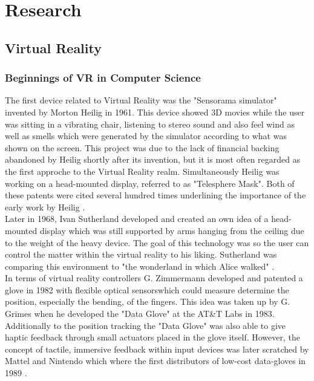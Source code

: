 \documentclass{report}
\begin{document}
\chapter{Research}

	\section{Virtual Reality}
	\startsection
		\subsection{Beginnings of VR in Computer Science}
		\startsubsection			
			The first device related to Virtual Reality was the "Sensorama simulator" invented by Morton Heilig \cite{Hei61} in 1961. This device showed 3D movies while the user was sitting in a vibrating chair, listening to stereo sound and also feel wind as well as smells which were generated by the simulator according to what was shown on the screen. This project was due to the lack of financial backing abandoned by Heilig shortly after its invention, but it is most often regarded as the first approche to the Virtual Reality realm. Simultaneously Heilig was working on a head-mounted display, referred to as "Telesphere Mask". Both of these patents were cited several hundred times underlining the importance of the early work by Heilig \cite{SKB15}. \\
			Later in 1968, Ivan Sutherland developed and created an own idea of a head-mounted display which was still supported by arms hanging from the ceiling due to the weight of the heavy device. The goal of this technology was so the user can control the matter within the virtual reality to his liking. Sutherland was comparing this environment to "the wonderland in which Alice walked" \cite{IS65}. \\
			In terms of virtual reality controllers G. Zimmermann developed and patented a glove in 1982 with flexible optical sensorswhich could measure determine the position, especially the bending, of the fingers. This idea was taken up by G. Grimes when he developed the "Data Glove" at the AT\&T Labs in 1983. Additionally to the position tracking the "Data Glove" was also able to give haptic feedback through small actuators placed in the glove itself. However, the concept of tactile, immersive feedback within input devices was later scratched by Mattel and Nintendo which where the first distributors of low-cost data-gloves in 1989 \cite{SKB15}. \\
\end{document}
